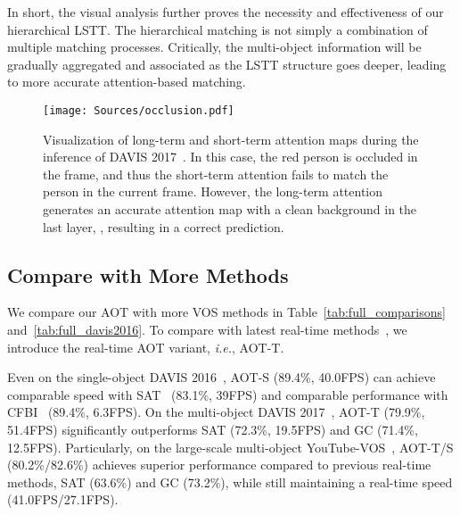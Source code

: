\documentclass{article}
\def\ie{\emph{i.e.}}
\begin{document}
In short, the visual analysis further proves the necessity and effectiveness of our hierarchical LSTT. The hierarchical matching is not simply a combination of multiple matching processes. Critically, the multi-object information will be gradually aggregated and associated as the LSTT structure goes deeper, leading to more accurate attention-based matching.

\begin{figure}[t!]
    \centering
    \texttt{[image: Sources/occlusion.pdf]}

    \caption{Visualization of long-term and short-term attention maps during the inference of DAVIS 2017~\cite{davis2017}. In this case, the red person is occluded in the  frame, and thus the short-term attention fails to match the person in the current frame. However, the long-term attention generates an accurate attention map with a clean background in the last layer, , resulting in a correct prediction.}
    \label{fig:occlusion}

\end{figure} 



\subsection{Compare with More Methods}

We compare our AOT with more VOS methods in Table~\ref{tab:full_comparisons} and~\ref{tab:full_davis2016}. To compare with latest real-time methods~\cite{realtimevos1,realtimevos2}, we introduce the real-time AOT variant, \ie, AOT-T. 

Even on the single-object DAVIS 2016~\cite{davis2016}, AOT-S (89.4\%, 40.0FPS) can achieve comparable speed with SAT~\cite{realtimevos1} (83.1\%, 39FPS) and comparable performance with CFBI~\cite{cfbi} (89.4\%, 6.3FPS). On the multi-object DAVIS 2017~\cite{davis2017}, AOT-T (79.9\%, 51.4FPS) significantly outperforms SAT (72.3\%, 19.5FPS) and GC (71.4\%, 12.5FPS). Particularly, on the large-scale multi-object YouTube-VOS~\cite{youtubevos}, AOT-T/S (80.2\%/82.6\%) achieves superior performance compared to previous real-time methods, SAT (63.6\%) and GC (73.2\%), while still maintaining a real-time speed (41.0FPS/27.1FPS).
\end{document}
